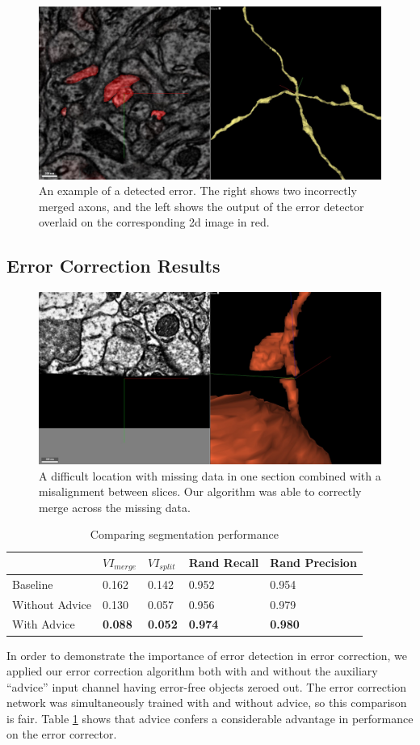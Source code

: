 \documentclass{article}
\begin{document}
\begin{figure}
\begin{center}
	\includegraphics[width=0.65\linewidth]{x_error.jpg}
	\caption{An example of a detected error. The right shows two incorrectly merged axons, and the left shows the output of the error detector overlaid on the corresponding 2d image in red.}
	\label{fig:x_error}
\end{center}
\end{figure}


\subsection{Error Correction Results}
\begin{figure}
\begin{center}
	\includegraphics[width=0.65\linewidth]{difficult.jpg}
	\caption{A difficult location with missing data in one section combined with a misalignment between slices. Our algorithm was able to correctly merge across the missing data.}
	\label{fig:difficult}
\end{center}
\end{figure}
\begin{table}[h]
  \caption{Comparing segmentation performance}
  \label{table:vi_scores}
  \centering
  \begin{tabular}{lllll}
    \toprule
	& $VI_{merge}$ & $VI_{split}$ & Rand Recall & Rand Precision\\
    \midrule
    Baseline & 0.162 & 0.142 & 0.952 & 0.954\\
    Without Advice & 0.130 & 0.057 & 0.956 & 0.979\\
	With Advice & \textbf{0.088} & \textbf{0.052} & \textbf{0.974} & \textbf{0.980}\\
    \bottomrule
  \end{tabular}
\end{table}
In order to demonstrate the importance of error detection in error correction, we applied our error correction algorithm both with and without the auxiliary ``advice'' input channel having error-free objects zeroed out. The error correction network was simultaneously trained with and without advice, so this comparison is fair. Table \ref{table:vi_scores} shows that advice confers a considerable advantage in performance on the error corrector.
\end{document}
